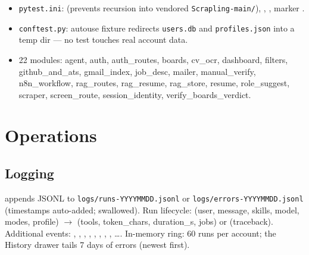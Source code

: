 \documentclass[11pt,a4paper]{article}
\newcommand{\file}[1]{\texttt{\small #1}}
\begin{document}
\begin{itemize}[leftmargin=2em]
  \item \file{pytest.ini}:  (prevents recursion
        into vendored \file{Scrapling-main/}), ,
        , marker .
  \item \file{conftest.py}: autouse  fixture
        redirects \file{users.db} and \file{profiles.json} into a temp dir
        --- no test touches real account data.
  \item 22 modules: agent, auth, auth\_routes, boards, cv\_ocr, dashboard,
        filters, github\_and\_ats, gmail\_index, job\_desc, mailer,
        manual\_verify, n8n\_workflow, rag\_routes, rag\_resume,
        rag\_store, resume, role\_suggest, scraper, screen\_route,
        session\_identity, verify\_boards\_verdict.
\end{itemize}

\section{Operations}
\label{sec:ops}

\subsection{Logging}
 appends JSONL to
\file{logs/runs-YYYYMMDD.jsonl} or \file{logs/errors-YYYYMMDD.jsonl}
(timestamps auto-added;  swallowed). Run lifecycle:
 (user, message, skills, model, modes, profile) $\rightarrow$
 (tools, token\_chars, duration\_s, jobs) or 
(traceback). Additional events: ,
, , ,
, , ,
, \ldots. In-memory ring: 60 runs per account; the
History drawer tails 7 days of errors (newest first).
\end{document}
